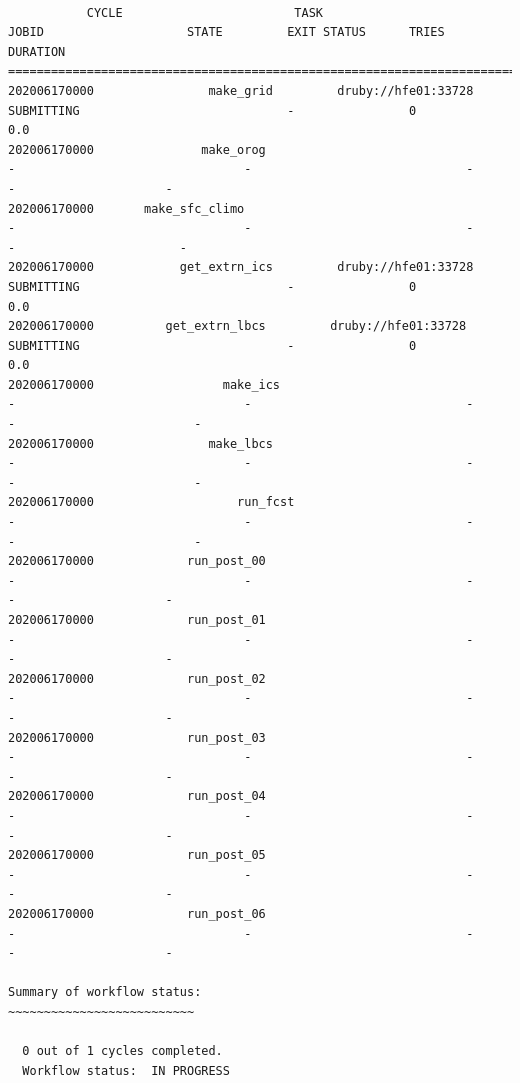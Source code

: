 \documentclass[11pt,fleqn]{report}              %
\begin{document}
\lstset{language=bash}   
\begin{lstlisting}[frame=trBL, basicstyle=\tiny]

           CYCLE                        TASK                                JOBID                    STATE         EXIT STATUS      TRIES         DURATION
====================================================================================================
202006170000                make_grid         druby://hfe01:33728          SUBMITTING                             -                0                       0.0
202006170000               make_orog                                       -                                -                              -                -           	      -
202006170000       make_sfc_climo                                       -                                -                              -                -             	         -
202006170000            get_extrn_ics         druby://hfe01:33728          SUBMITTING                             -                0                       0.0
202006170000          get_extrn_lbcs         druby://hfe01:33728          SUBMITTING                             -                0                       0.0
202006170000                  make_ics                                       -                                -                              -                -              	        -
202006170000                make_lbcs                                       -                                -                              -                -                         -
202006170000                    run_fcst                                       -                                -                              -                -                         -
202006170000             run_post_00                                       -                                -                              -                -           	      -
202006170000             run_post_01                                       -                                -                              -                -            	      -
202006170000             run_post_02                                       -                                -                              -                -            	      -
202006170000             run_post_03                                       -                                -                              -                -            	      -
202006170000             run_post_04                                       -                                -                              -                -            	      -
202006170000             run_post_05                                       -                                -                              -                -            	      -
202006170000             run_post_06                                       -                                -                              -                -            	      -

Summary of workflow status:
~~~~~~~~~~~~~~~~~~~~~~~~~~

  0 out of 1 cycles completed.
  Workflow status:  IN PROGRESS

\end{lstlisting}
\end{document}
